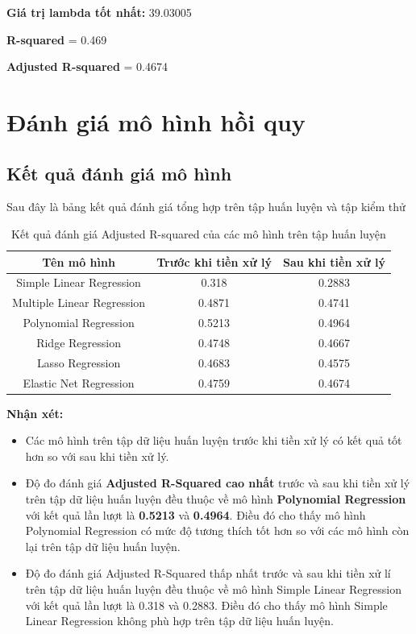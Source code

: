 \documentclass[runningheads]{llncs}
\begin{document}
\textbf{Giá trị lambda tốt nhất:} 39.03005

\textbf{R-squared} = 0.469

\textbf{Adjusted R-squared} = 0.4674 


\section{Đánh giá mô hình hồi quy}

\subsection{Kết quả đánh giá mô hình}

Sau đây là bảng kết quả đánh giá tổng hợp trên tập huấn luyện và tập kiểm thử

\begin{table}[H]
	\setlength{\tabcolsep}{0.5em}
	\renewcommand{\arraystretch}{1.2}
	\begin{center}
		\caption{Kết quả đánh giá Adjusted R-squared của các mô hình trên tập huấn luyện}\label{tab3}
		\begin{tabular}{|c|c|c|}
			\hline
			Tên mô hình&Trước khi tiền xử lý&Sau khi tiền xử lý\\
			\hline
			Simple Linear Regression&0.318&0.2883\\
			\hline
			Multiple Linear Regression&0.4871&0.4741\\
			\hline
			Polynomial Regression&0.5213&0.4964\\
			\hline
			Ridge Regression&0.4748&0.4667\\
			\hline
			Lasso Regression&0.4683&0.4575\\
			\hline
			Elastic Net Regression&0.4759&0.4674\\
			\hline
		\end{tabular}			
	\end{center}
\end{table}

\textbf{Nhận xét:} 
\begin{itemize}
	\item Các mô hình trên tập dữ liệu huấn luyện trước khi tiền xử lý có kết quả tốt hơn so với sau khi tiền xử lý.
	\item Độ đo đánh giá \textbf{Adjusted R-Squared cao nhất} trước và sau khi tiền xử lý trên tập dữ liệu huấn luyện đều thuộc về mô hình \textbf{Polynomial Regression} với kết quả lần lượt  là \textbf{0.5213} và \textbf{0.4964}. Điều đó cho thấy mô hình Polynomial Regression có mức độ tương thích tốt hơn so với các mô hình còn lại trên tập dữ liệu huấn luyện.
	\item Độ đo đánh giá Adjusted R-Squared thấp nhất trước và sau khi tiền xử lí trên tập dữ liệu huấn luyện đều thuộc về mô hình Simple Linear Regression với kết quả lần lượt là 0.318 và 0.2883. Điều đó cho thấy mô hình Simple Linear Regression không phù hợp trên tập dữ liệu huấn luyện. 
	
\end{itemize}
\end{document}
